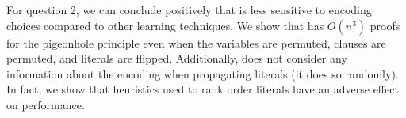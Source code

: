 For question 2, we can conclude positively that \tool is less sensitive to
encoding choices compared to other \pr learning techniques. We show that \tool
has $O(n^3)$ proofs for the pigeonhole principle even when the variables are
permuted, clauses are permuted, and literals are flipped. Additionally, \tool
does not consider any information about the encoding when propagating literals
(it does so randomly). In fact, we show that heuristics used to rank order
literals have an adverse effect on performance.
